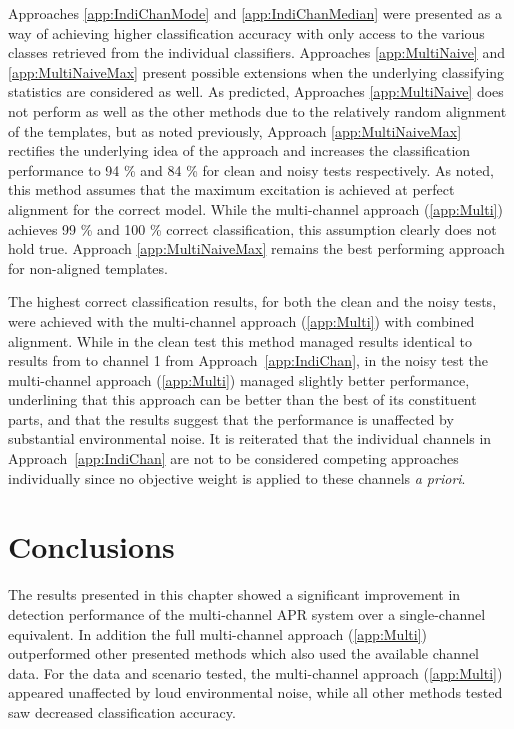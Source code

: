 Approaches \ref{app:IndiChanMode} and \ref{app:IndiChanMedian} were presented as a way of achieving higher classification accuracy with only access to the various classes retrieved from the individual classifiers. Approaches \ref{app:MultiNaive} and \ref{app:MultiNaiveMax} present possible extensions when the underlying classifying statistics are considered as well. As predicted, Approaches \ref{app:MultiNaive} does not perform as well as the other methods due to the relatively random alignment of the templates, but as noted previously, Approach \ref{app:MultiNaiveMax} rectifies the underlying idea of the approach and increases the classification performance to 94 \% and 84 \% for clean and noisy tests respectively. As noted, this method assumes that the maximum excitation is achieved at perfect alignment for the correct model. While the multi-channel approach (\ref{app:Multi}) achieves 99 \% and 100 \% correct classification, this assumption clearly does not hold true. Approach \ref{app:MultiNaiveMax} remains the best performing approach for non-aligned templates.

The highest correct classification results, for both the clean and the noisy tests, were achieved with the multi-channel approach (\ref{app:Multi}) with combined alignment. While in the clean test this method managed results identical to results from to channel 1 from Approach~\ref{app:IndiChan}, in the noisy test the multi-channel approach (\ref{app:Multi}) managed slightly better performance, underlining that this approach can be better than the best of its constituent parts, and that the results suggest that the performance is unaffected by substantial environmental noise. It is reiterated that the individual channels in Approach~\ref{app:IndiChan} are not to be considered competing approaches individually since no objective weight is applied to these channels \emph{a priori}.



\section{Conclusions}
The results presented in this chapter showed a significant improvement in detection performance of the multi-channel APR system over a single-channel equivalent. In addition the full multi-channel approach (\ref{app:Multi}) outperformed other presented methods which also used the available channel data. For the data and scenario tested, the multi-channel approach (\ref{app:Multi}) appeared unaffected by loud environmental noise, while all other methods tested saw decreased classification accuracy.

